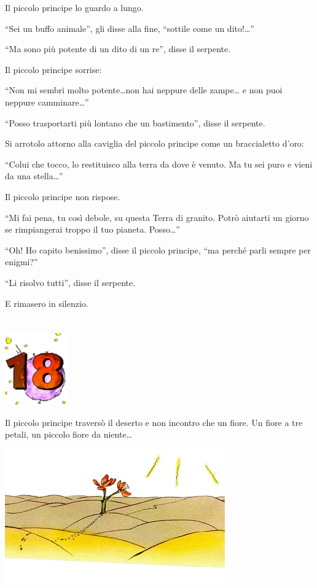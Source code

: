 \documentclass[11pt]{scrbook}
\begin{document}
Il piccolo principe lo guardo a lungo.

``Sei un buffo animale'', gli disse alla fine, ``sottile come un dito!\ldots{}''

``Ma sono più potente di un dito di un re'', disse il serpente.

Il piccolo principe sorrise:

``Non mi sembri molto potente\ldots{}non hai neppure delle zampe\ldots{} e non puoi neppure camminare\ldots{}''

``Posso trasportarti più lontano che un bastimento'', disse il serpente.

Si arrotolo attorno alla caviglia del piccolo principe come un braccialetto d'oro:

``Colui che tocco, lo restituisco alla terra da dove è venuto. Ma tu sei puro e vieni da una stella\ldots{}''

Il piccolo principe non rispose.

``Mi fai pena, tu così debole, su questa Terra di granito. Potrò aiutarti un giorno se rimpiangerai troppo il tuo pianeta. Posso\ldots{}''

``Oh! Ho capito benissimo'', disse il piccolo principe, ``ma perché parli sempre per enigmi?''

``Li risolvo tutti'', disse il serpente.

E rimasero in silenzio.

\chapter{}
\begin{center}
\includegraphics{img/chapter18}
\end{center}

Il piccolo principe traversò il deserto e non incontro che un fiore. Un fiore a tre petali, un piccolo fiore da niente\ldots{}

\begin{center}
\includegraphics{img/18a}
\end{center}
\end{document}
